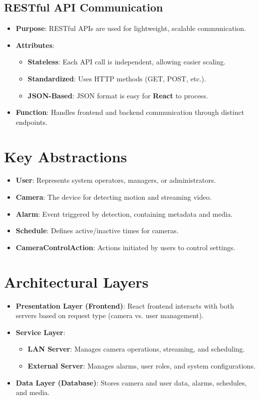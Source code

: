 \documentclass{article}
\begin{document}
\subsection{RESTful API Communication}
\begin{itemize}
    \item \textbf{Purpose}: RESTful APIs are used for lightweight, scalable communication.
    \item \textbf{Attributes}:
    \begin{itemize}
        \item \textbf{Stateless}: Each API call is independent, allowing easier scaling.
        \item \textbf{Standardized}: Uses HTTP methods (GET, POST, etc.).
        \item \textbf{JSON-Based}: JSON format is easy for \textbf{React} to process.
    \end{itemize}
    \item \textbf{Function}: Handles frontend and backend communication through distinct endpoints.
\end{itemize}

\section{Key Abstractions}
\begin{itemize}
    \item \textbf{User}: Represents system operators, managers, or administrators.
    \item \textbf{Camera}: The device for detecting motion and streaming video.
    \item \textbf{Alarm}: Event triggered by detection, containing metadata and media.
    \item \textbf{Schedule}: Defines active/inactive times for cameras.
    \item \textbf{CameraControlAction}: Actions initiated by users to control settings.
\end{itemize}

\section{Architectural Layers}
\begin{itemize}
    \item \textbf{Presentation Layer (Frontend)}: React frontend interacts with both servers based on request type (camera vs. user management).
    \item \textbf{Service Layer}:
    \begin{itemize}
        \item \textbf{LAN Server}: Manages camera operations, streaming, and scheduling.
        \item \textbf{External Server}: Manages alarms, user roles, and system configurations.
    \end{itemize}
    \item \textbf{Data Layer (Database)}: Stores camera and user data, alarms, schedules, and media.
\end{itemize}
\end{document}
